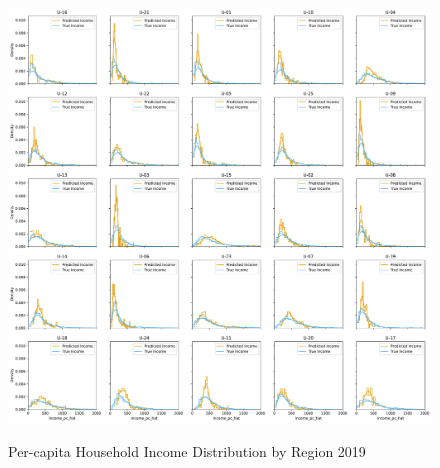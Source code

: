 \begin{figure}[H]
    \centering
    \caption{Per-capita Household Income Distribution by Region 2019}
    \includegraphics[width=\textwidth]{../figures/fig2_prediction_vs_true_income_by_region_lasso_training_weighted.pdf}
    \label{fig:enter-label}
\end{figure}


